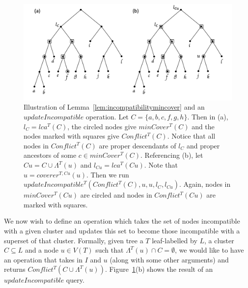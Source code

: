 \documentclass[final,1p,times]{elsarticle}
\newcommand{\leafset}{\Lambda}
\begin{document}
    \begin{figure}[ht]
        \includegraphics[scale=0.5]{incompatibility}
        \centering
        \caption[Incompatibility and the $updateIncompatible$ operation]{Illustration of Lemma~\ref{lem:incompatibilitymincover} and an $updateIncompatible$ operation. Let $C = \{a, b, c, f, g, h\}$. Then in (a), $l_C = lca^T(C)$, the circled nodes give $minCover^{T}(C)$ and the nodes marked with squares give $Conflict^T(C)$. Notice that all nodes in $Conflict^T(C)$ are proper descendants of $l_C$ and proper ancestors of some $c \in minCover^{T}(C)$. Referencing (b), let $Cu = C \cup \leafset^{T}(u)$ and $l_{Cu} = lca^{T}(Cu)$. Note that $u = coverer^{T, Cu}(u)$. Then we run $updateIncompatible^{T}(Conflict^{T}(C), u, u, l_C, l_{Cu})$. Again, nodes in $minCover^{T}(Cu)$ are circled and nodes in $Conflict^{T}(Cu)$ are marked with squares.}
        \label{fig:incompatibility}
    \end{figure}

    We now wish to define an operation which takes the set of nodes incompatible with a given cluster and updates this set to become those incompatible with a superset of that cluster. Formally, given tree a $T$ leaf-labelled by $L$, a cluster $C \subseteq L$ and a node $u \in V(T)$ such that $\leafset^{T}(u) \cap C = \emptyset$, we would like to have an operation that takes in $I$ and $u$ (along with some other arguments) and returns $Conflict^{T}(C \cup \leafset^{T}(u))$. Figure~\ref{fig:incompatibility}(b) shows the result of an $updateIncompatible$ query.
\end{document}
